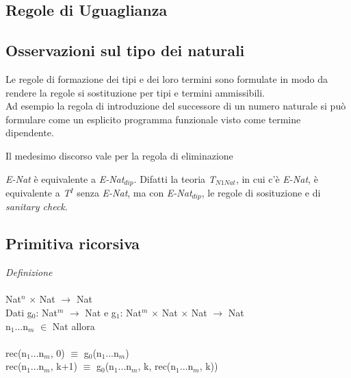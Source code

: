 \begin{prooftree}
\end{prooftree}

\subsection{Regole di Uguaglianza}
\label{subsec: uguaglianza-nat}
\begin{prooftree}
\end{prooftree}

\subsection{Osservazioni sul tipo dei naturali}
\label{subsec:osservazioni-naturali}
\normalsize
Le regole di formazione dei tipi e dei loro termini sono formulate in modo da rendere la regole si sostituzione per tipi e termini ammissibili.\\
Ad esempio la regola di introduzione del successore di un numero naturale si pu\`o formulare come un esplicito programma funzionale visto come termine dipendente.
\begin{prooftree}
\end{prooftree}
Il medesimo discorso vale per la regola di eliminazione
\begin{prooftree}
\end{prooftree}
\noindent
\textit{E-Nat} \`e equivalente a \textit{E-Nat$_{dip}$}. Difatti la teoria \textit{T$_{N1Nat}$}, in cui c'\`e \textit{E-Nat}, \`e equivalente a \textit{T{\scriptsize $^I$}} senza \textit{E-Nat}, ma con \textit{E-Nat$_{dip}$}, le regole di sosituzione e di \textit{sanitary check}.

\subsection{Primitiva ricorsiva}
\label{subsec: primitiva-ricorsiva}
\textit{Definizione}\\\\
Nat$^n$ $\times$ Nat $\rightarrow$ Nat\\
Dati g$_0$: Nat$^m$ $\rightarrow$ Nat e g$_1$: Nat$^m$ $\times$ Nat $\times$ Nat $\rightarrow$ Nat\\
n$_1$...n$_m$ $\in$ Nat allora\\\\
rec(n$_1$...n$_m$, 0) $\equiv$ g$_0$(n$_1$...n$_m$)\\
rec(n$_1$...n$_m$, k+1) $\equiv$ g$_0$(n$_1$...n$_m$, k, rec(n$_1$...n$_m$, k))

